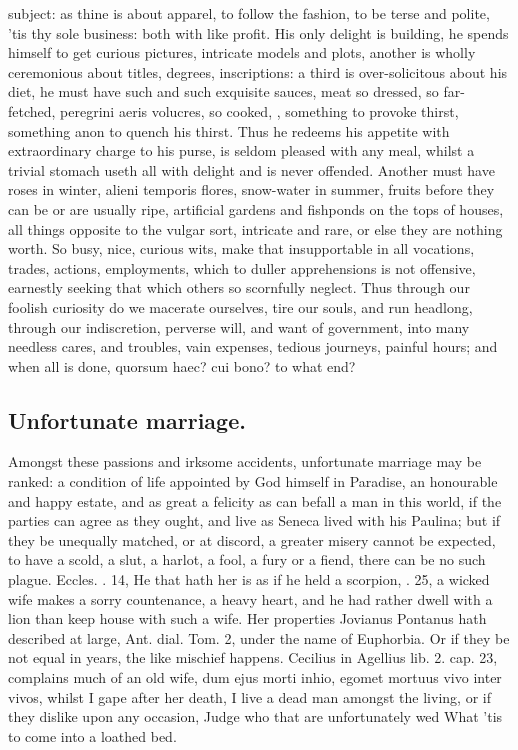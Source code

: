 {subject: as thine is about apparel, to follow the fashion, to be terse
and polite, 'tis thy sole business: both with like profit. His only
delight is building, he spends himself to get curious pictures,
intricate models and plots, another is wholly ceremonious about titles,
degrees, inscriptions: a third is over-solicitous about his diet, he
must have such and such exquisite sauces, meat so dressed, so
far-fetched, peregrini aeris volucres, so cooked, \etc{}, something to
provoke thirst, something anon to quench his thirst. Thus he redeems
his appetite with extraordinary charge to his purse, is seldom pleased
with any meal, whilst a trivial stomach useth all with delight and is
never offended. Another must have roses in winter, alieni temporis
flores, snow-water in summer, fruits before they can be or are usually
ripe, artificial gardens and fishponds on the tops of houses, all
things opposite to the vulgar sort, intricate and rare, or else they
are nothing worth. So busy, nice, curious wits, make that insupportable
in all vocations, trades, actions, employments, which to duller
apprehensions is not offensive, earnestly seeking that which others so
scornfully neglect. Thus through our foolish curiosity do we macerate
ourselves, tire our souls, and run headlong, through our indiscretion,
perverse will, and want of government, into many needless cares, and
troubles, vain expenses, tedious journeys, painful hours; and when all
is done, quorsum haec? cui bono? to what end?

\subsection{Unfortunate marriage.}
Amongst these passions and irksome accidents,
unfortunate marriage may be ranked: a condition of life appointed by
God himself in Paradise, an honourable and happy estate, and as great a
felicity as can befall a man in this world, if the parties can
agree as they ought, and live as Seneca lived with his Paulina;
but if they be unequally matched, or at discord, a greater misery
cannot be expected, to have a scold, a slut, a harlot, a fool, a fury
or a fiend, there can be no such plague. Eccles. . 14, He that hath
her is as if he held a scorpion, \etc{} . 25, a wicked wife makes a
sorry countenance, a heavy heart, and he had rather dwell with a lion
than keep house with such a wife. Her properties Jovianus
Pontanus hath described at large, Ant. dial. Tom. 2, under the name of
Euphorbia. Or if they be not equal in years, the like mischief happens.
Cecilius in Agellius lib. 2. cap. 23, complains much of an old wife,
dum ejus morti inhio, egomet mortuus vivo inter vivos, whilst I gape
after her death, I live a dead man amongst the living, or if they
dislike upon any occasion,
Judge who that are unfortunately wed
What 'tis to come into a loathed bed.

}
